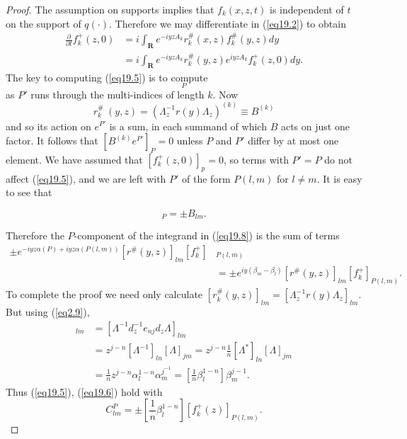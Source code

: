 \documentclass{surv-l}
\theoremstyle{plain}
\theoremstyle{definition}
\numberwithin{equation}{chapter}
\begin{document}
\begin{proof}
The assumption on supports implies that $f_{k}(x, z,t)$ is independent of $t$ on the support of $q(\cdot)$. Therefore we may differentiate in (\ref{eq19.2}) to obtain
\begin{align}\label{eq19.8}
\frac{\partial}{\partial t}f_{k}^{+}(z, 0)&=i\int_{\mathbf{R}}e^{-iyzA_{k}}r_{k}^{\#}(x, z)f_{k}^{\#}(y,z)dy\\\nonumber
&=i\int_{\mathbf{R}}e^{-iyzA_{k}}r_{k}^{\#}(y, z)e^{iyzA_{k}}f_{k}^{+}(z, 0)dy.
\end{align}
The key to computing (\ref{eq19.5}) is to compute
\begin{equation*}
[r_{k}^{\#}(y,z)e^{P'}]_{P}
\end{equation*}
as $P'$ runs through the multi-indices of length $k$. Now
\begin{equation*}
r_{k}^{\#}\ (y,z)=(\Lambda_{z}^{-1}r(y)\Lambda_{z})^{(k)}\equiv B^{(k)}
\end{equation*}
and so its action on $e^{P'}$ is a sum, in each summand of which $B$ acts on just one factor. It follows that $[B^{(k)}e^{P'}]_{P}=0$ unless $P$ and $P'$ differ by at most one element. We have assumed that $[f_{k}^{+}(z, 0)]_{p}=0$, so terms with $P'=P$ do not affect (\ref{eq19.5}), and we are left with $P'$ of the form $P(l,m)$ for $l\neq m$. It is easy to see that

\begin{equation*}
[B^{(k)}e^{P(l,m)}]_{P}=\pm B_{lm}.
\end{equation*}

Therefore the $P$-component of the integrand in (\ref{eq19.8}) is the sum of terms
\begin{align*}
\pm e^{-iyz\alpha(P)+iyz\alpha(P(l,m))}[r^{\#}(y, z)]_{lm}[f_{k}^{+}]&_{P(l,m)}\\
&=\pm e^{iy(\beta_{m}-\beta_{l})}[r^{\#}(y, z)]_{lm}[f_{k}^{+}]_{P(l,m)}.
\end{align*}
To complete the proof we need only calculate $[r_{k}^{\#}(y, z)]_{lm}=[\Lambda_{z}^{-1}r(y)\Lambda_{z}]_{lm}$. But using (\ref{eq2.9}),
\begin{align*}
[\Lambda_{z}^{-1}e_{nj}\Lambda_{z}]_{lm}&=[\Lambda^{-1}d_{z}^{-1}e_{nj}d_{z}\Lambda]_{lm}\\
&=z^{j-n}[\Lambda^{-1}]_{ln}[\Lambda]_{j m}=z^{j-n}\frac{1}{n}[\Lambda^{*}]_{ln}[\Lambda]_{jm}\\
&=\frac{1}{n}z^{j-n}\alpha_{l}^{1-n}\alpha_{m}^{j^{-1}}=\left[\frac{1}{n}\beta_{l}^{1-n}\right]\beta_{m}^{j-1}.
\end{align*}
Thus (\ref{eq19.5}), (\ref{eq19.6}) hold with
\begin{equation*}
C_{lm}^{P}=\pm\left[\frac{1}{n}\beta_{l}^{1-n}\right][f_{k}^{+}(z)]_{P(l,m)}.
\end{equation*}
\end{proof}
\end{document}
